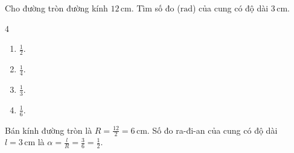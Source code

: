 \begin{baitap}
	Cho đường tròn đường kính $12\,\mathrm{cm}$. Tìm số đo ($\mathrm{rad}$) của cung có độ dài $3\,\mathrm{cm}$.
	\begin{multicols}{4}
		\begin{enumerate}
			\item $\frac{1}{2}$.
			\item $\frac{1}{4}$.
			\item $\frac{1}{3}$.
			\item $\frac{1}{6}$.
		\end{enumerate}
	\end{multicols}
	\begin{traloi}
		Bán kính đường tròn là $R = \frac{12}{2} = 6\,\mathrm{cm}$. Số đo ra-đi-an của cung có độ dài $l = 3\,\mathrm{cm}$ là $\alpha = \frac{l}{R} = \frac{3}{6} = \frac{1}{2}$.
	\end{traloi}
\end{baitap}

